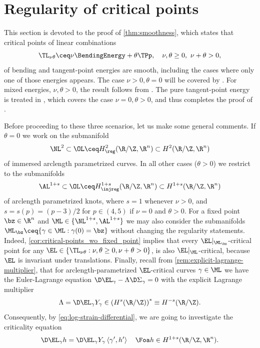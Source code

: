 \section{Regularity of critical points}\label{sec:Smoothness}
This section is devoted to the proof of \cref{thm:smoothness}, which states that critical points of linear combinations 
\[\TL_{\nu\theta}\ceq\nu\BendingEnergy+\theta\TPp, \quad \nu,\theta\ge 0,\,\,\nu+\theta>0,\]
of bending and tangent-point energies are smooth, including the cases where only one of those energies appears. The case $ \nu>0,\theta=0 $ will be covered by . For mixed energies, $ \nu,\theta>0 $, the result follows from . The pure tangent-point energy is treated in , which covers the case $ \nu=0,\theta>0 $, and thus completes the proof of . 

Before proceeding to these three scenarios, let us make some general comments. If $ \theta=0 $ we work on the submanifold 
\[\NL^2\subset\OL\ceq H^{2}_{\reg}(\R/\Z,\R^n)\subset H^{2}(\R/\Z,\R^n)\]
of immersed arclength parametrized curves. In all other cases ($ \theta>0 $) we restrict to the submanifolds 
\[\AL^{1+s}\subset \OL\ceq H^{1+s}_{\injreg}(\R/\Z,\R^n)\subset H^{1+s}(\R/\Z,\R^n)\]
of arclength parametrized knots, where $ s=1 $ whenever $ \nu>0 $, and $ s=s(p)=(p-3)/2 $ for $ p\in (4,5) $ if $ \nu=0 $ and $ \theta>0 $. 
For a fixed point $ \bz\in \R^n $ and $ \ML\in \{\NL^{1+s},\AL^{1+s}\} $ we may also consider the submanifolds $ \ML_{\bz}\ceq\{\gamma\in \ML: \gamma(0)=\bz\} $ without changing the regularity statements. Indeed, \cref{cor:critical-points_wo_fixed_point} implies that every $ \EL|_{\ML_{\bz}}  $-critical point for any $ \EL\in \{\TL_{\nu\theta}:\nu,\theta\ge0,\nu+\theta>0\} $, is also $ \EL|_{\ML} $-critical, because $ \EL $ is invariant under translations. 
Finally, recall from \cref{rem:explicit-lagrange-multiplier}, that for arclength-parametrized $ \EL $-critical curves $ \gamma\in\ML $ we have the Euler-Lagrange equation $ \D\EL_{\gamma}-\Lambda\D\Sigma_{\gamma}=0 $ with the explicit Lagrange multiplier 
\[\Lambda=\D\EL_{\gamma}Y_{\gamma}\in \left( H^{s}( \R/\Z) \right)^*\equiv H^{-s}(\R/\Z).\]
Consequently, by \cref{eq:log-strain-differential}, we are going to investigate the criticality equation 
\begin{equation}    \label{eq:CriticalityWithoutLambda}
\begin{aligned}
    \D\EL_{\gamma}h=\D\EL_{\gamma}Y_{\gamma}\left\langle \gamma',h' \right\rangle\quad \Foa h\in H^{1+s}(\R/\Z,\R^n).
\end{aligned}
\end{equation}
